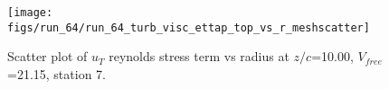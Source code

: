 \begin{figure}[H]
\centering
\texttt{[image: figs/run\_64/run\_64\_turb\_visc\_ettap\_top\_vs\_r\_meshscatter]}
\caption{Scatter plot of $
u_T$ reynolds stress term vs radius at $z/c$=10.00, $V_{free}$=21.15, station 7.}
\end{figure}



